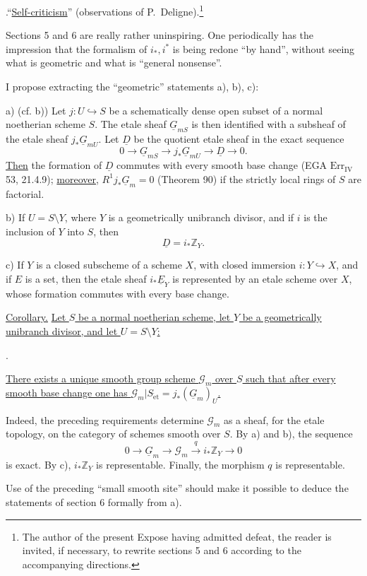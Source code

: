 \medskip
\noindent {}.\quad ``\underline{Self-criticism}'' (observations of
P.~Deligne).\footnote{The author of the present Expose having admitted
defeat, the reader is invited, if necessary, to rewrite sections 5 and 6
according to the accompanying directions.}

Sections 5 and 6 are really rather uninspiring.  One periodically has the
impression that the formalism of $i_*,i^*$ is being redone ``by hand'',
without seeing what is geometric and what is ``general nonsense''.

I propose extracting the ``geometric'' statements a), b), c):

\smallskip
\noindent a) (cf.  b)) Let $j:U\hookrightarrow S$ be a schematically
dense open subset of a normal noetherian scheme $S$.  The etale sheaf
$\underline G_{mS}$ is then identified with a subsheaf of the etale sheaf
$j_*\underline G_{mU}$.  Let $\underline D$ be the quotient etale sheaf in
the exact sequence
\[
 0\longrightarrow\underline G_{mS}\longrightarrow
 j_*\underline G_{mU}\longrightarrow\underline D\longrightarrow0.
\]
\underline{Then} the formation of $\underline D$ commutes with every smooth
base change (EGA $\mathrm{Err}_{\mathrm{IV}}$ 53, 21.4.9); \underline{moreover},
$R^1j_*\underline G_m=0$ (Theorem 90) if the strictly local rings of $S$ are
factorial.

\smallskip
\noindent b) If $U=S\setminus Y$, where $Y$ is a geometrically unibranch
divisor, and if $i$ is the inclusion of $Y$ into $S$, then
\[
 \underline D=i_*\mathbb Z_Y.
\]

\smallskip
\noindent c) If $Y$ is a closed subscheme of a scheme $X$, with closed immersion
$i:Y\hookrightarrow X$, and if $E$ is a set,
then the etale sheaf $i_*\underline E_Y$ is represented by an etale scheme
over $X$, whose formation commutes with every base change.

\medskip
\noindent\underline{Corollary.}  \underline{Let $S$ be a normal noetherian
scheme, let $Y$ be a geometrically unibranch divisor, and let
$U=S\setminus Y$:}
\begin{center}
\qquad .
\end{center}
\underline{There exists a unique smooth group scheme $\mathcal G_m$ over
$S$ such that after every smooth base change one has
$\mathcal G_m|S_{\mathrm{\acute{e}t}}=j_*(\underline G_m)_U$.}

Indeed, the preceding requirements determine $\mathcal G_m$ as a sheaf, for
the etale topology, on the category of schemes smooth over $S$.  By a) and
b), the sequence
\[
 0\longrightarrow\underline G_m\longrightarrow\mathcal G_m
 \xrightarrow{\ q\ }i_*\mathbb Z_Y\longrightarrow0
\]
is exact.  By c), $i_*\mathbb Z_Y$ is representable.  Finally, the morphism
$q$ is representable.

Use of the preceding ``small smooth site'' should make it possible to deduce
the statements of section 6 formally from a).
